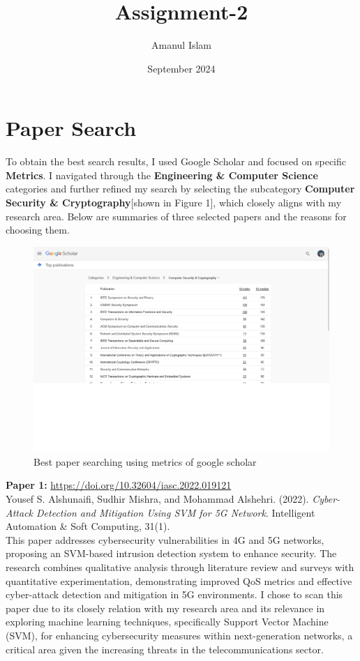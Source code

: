 \documentclass[10pt]{article}
\title{Assignment-2}
\author{Amanul Islam}
\date{September 2024}
\begin{document}
\maketitle

\section{ Paper Search}
To obtain the best search results, I used Google Scholar and focused on specific \textbf{Metrics}. I navigated through the \textbf{Engineering \& Computer Science} categories and further refined my search by selecting the subcategory \textbf{Computer Security \& Cryptography}[shown in Figure 1], which closely aligns with my research area. Below are summaries of three selected papers and the reasons for choosing them.

\begin{figure}[ht]
    \centering
    \includegraphics[width=\textwidth]{subcategory.jpg} 
    \caption{Best paper searching using metrics of google scholar }
    \label{fig:toc}
\end{figure}

\noindent\textbf{Paper 1:} \url{https://doi.org/10.32604/iasc.2022.019121} \\
Yousef S. Alshunaifi, Sudhir Mishra, and Mohammad Alshehri. (2022). \textit{Cyber-Attack Detection and Mitigation Using SVM for 5G Network}. Intelligent Automation \& Soft Computing, 31(1).\\

\noindent This paper addresses cybersecurity vulnerabilities in 4G and 5G networks, proposing an SVM-based intrusion detection system to enhance security. The research combines qualitative analysis through literature review and surveys with quantitative experimentation, demonstrating improved QoS metrics and effective cyber-attack detection and mitigation in 5G environments. I chose to scan this paper due to its closely relation with my research area and its  relevance in exploring machine learning techniques, specifically Support Vector Machine (SVM), for enhancing cybersecurity measures within next-generation networks, a critical area given the increasing threats in the telecommunications sector.\\
\end{document}

